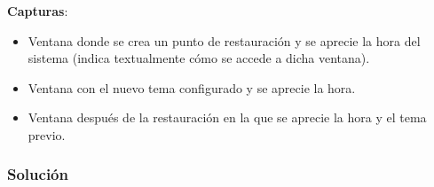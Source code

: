 \textbf{Capturas}:

\begin{itemize}
    \item Ventana donde se crea un punto de restauración y se aprecie la hora del sistema (indica textualmente cómo se accede a dicha ventana).
    \item Ventana con el nuevo tema configurado y se aprecie la hora.
    \item Ventana después de la restauración en la que se aprecie la hora y el tema previo.
\end{itemize}

\subsubsection{Solución}



\newpage




